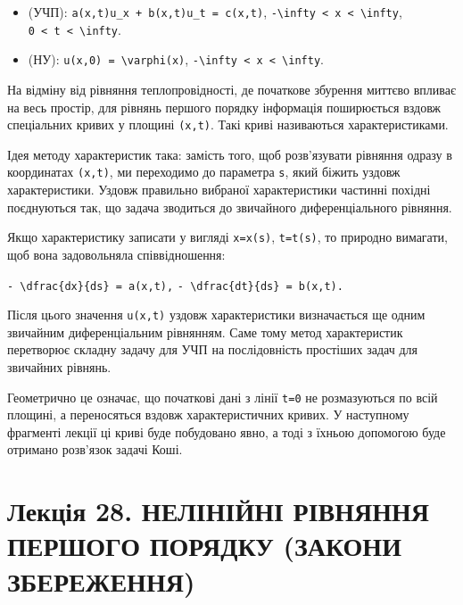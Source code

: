 \documentclass[
  ukrainian,
]{article}
\providecommand{\tightlist}{%
  \setlength{\itemsep}{0pt}\setlength{\parskip}{0pt}}
\begin{document}
\begin{itemize}
\tightlist
\item
  (УЧП): \texttt{a(x,t)u\_x\ +\ b(x,t)u\_t\ =\ c(x,t)},
  \texttt{-\textbackslash{}infty\ \textless{}\ x\ \textless{}\ \textbackslash{}infty},
  \texttt{0\ \textless{}\ t\ \textless{}\ \textbackslash{}infty}.
\item
  (НУ): \texttt{u(x,0)\ =\ \textbackslash{}varphi(x)},
  \texttt{-\textbackslash{}infty\ \textless{}\ x\ \textless{}\ \textbackslash{}infty}.
\end{itemize}

На відміну від рівняння теплопровідності, де початкове збурення миттєво
впливає на весь простір, для рівнянь першого порядку інформація
поширюється вздовж спеціальних кривих у площині \texttt{(x,t)}. Такі
криві називаються характеристиками.

Ідея методу характеристик така: замість того, щоб розв'язувати рівняння
одразу в координатах \texttt{(x,t)}, ми переходимо до параметра
\texttt{s}, який біжить уздовж характеристики. Уздовж правильно вибраної
характеристики частинні похідні поєднуються так, що задача зводиться до
звичайного диференціального рівняння.

Якщо характеристику записати у вигляді \texttt{x=x(s)}, \texttt{t=t(s)},
то природно вимагати, щоб вона задовольняла співвідношення:

\texttt{-\ \textquotesingle{}\textbackslash{}dfrac\{dx\}\{ds\}\ =\ a(x,t)\textquotesingle{},}
\texttt{-\ \textquotesingle{}\textbackslash{}dfrac\{dt\}\{ds\}\ =\ b(x,t)\textquotesingle{}.}

Після цього значення \texttt{u(x,t)} уздовж характеристики визначається
ще одним звичайним диференціальним рівнянням. Саме тому метод
характеристик перетворює складну задачу для УЧП на послідовність
простіших задач для звичайних рівнянь.

Геометрично це означає, що початкові дані з лінії \texttt{t=0} не
розмазуються по всій площині, а переносяться вздовж характеристичних
кривих. У наступному фрагменті лекції ці криві буде побудовано явно, а
тоді з їхньою допомогою буде отримано розв'язок задачі Коші.

\section{Лекція 28. НЕЛІНІЙНІ РІВНЯННЯ ПЕРШОГО ПОРЯДКУ (ЗАКОНИ
ЗБЕРЕЖЕННЯ)}\label{ux43bux435ux43aux446ux456ux44f-28.-ux43dux435ux43bux456ux43dux456ux439ux43dux456-ux440ux456ux432ux43dux44fux43dux43dux44f-ux43fux435ux440ux448ux43eux433ux43e-ux43fux43eux440ux44fux434ux43aux443-ux437ux430ux43aux43eux43dux438-ux437ux431ux435ux440ux435ux436ux435ux43dux43dux44f}
\end{document}
